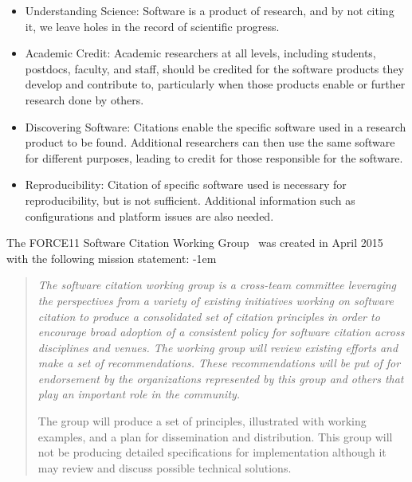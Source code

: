 \documentclass[11pt, oneside]{amsart}
\newenvironment{italicquotes}
{\begin{quote}\itshape}
{\end{quote}}
\begin{document}
\begin{itemize}
\item Understanding Science: Software is a product of research, and by not
citing it, we leave holes in the record of scientific progress.

\item Academic Credit: Academic researchers at all levels, including students,
postdocs, faculty, and staff, should be credited for the software products they
develop and contribute to, particularly when those products enable or further
research done by others.

\item Discovering Software: Citations enable the specific software used in a
research product to be found. Additional researchers can then use the same
software for different purposes, leading to credit for those responsible for the
software.

\item Reproducibility: Citation of specific software used is necessary for
reproducibility, but is not sufficient. Additional information such as
configurations and platform issues are also needed.

\end{itemize}


The FORCE11 Software Citation Working Group~\cite{f11scwg} was created in April
2015 with the following mission statement:
\advance\leftmargini -1em
\begin{italicquotes} 
The software citation working group is a cross-team committee leveraging the
perspectives from a variety of existing initiatives working on software citation
to produce a consolidated set of citation principles in order to encourage broad
adoption of a consistent policy for software citation across disciplines and
venues. The working group will review existing efforts and make a set of
recommendations. These recommendations will be put of for endorsement by the
organizations represented by this group and others that play an important role
in the community.

The group will produce a set of principles, illustrated with working examples,
and a plan for dissemination and distribution. This group will not be producing
detailed specifications for implementation although it may review and discuss
possible technical solutions.
\end{italicquotes}
\end{document}
